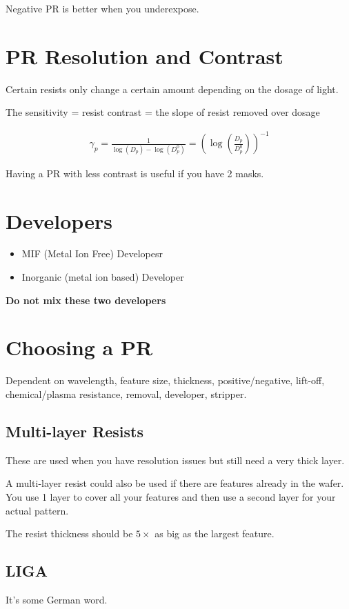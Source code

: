 \documentclass[fleqn]{report}
\newcommand{\equations} [1] {
\begin{gather*}
#1
\end{gather*}
}
\begin{document}
Negative PR is better when you underexpose.

\section{PR Resolution and Contrast}
Certain resists only change a certain amount depending 
on the dosage of light. 

The sensitivity = resist contrast = the slope of resist removed over dosage 

\equations{
    \gamma_p 
    =
    \frac{1}{
        \log(D_p)
        -
        \log(D_p^0)
    }
    =
    \left(\log(\frac{D_p}{D_p^0})\right)^{-1}
}

Having a PR with less contrast is useful if you have 2 masks. 


\section{Developers}
\begin{itemize}
    \item 
    MIF (Metal Ion Free) Developesr
    \item 
    Inorganic (metal ion based) Developer
\end{itemize}

\textbf{Do not mix these two developers}

\section{Choosing a PR}
Dependent on wavelength, feature size, thickness, positive/negative, 
lift-off, chemical/plasma resistance, removal, developer, stripper.

\subsection{Multi-layer Resists}
These are used when you have resolution issues but still need a very 
thick layer. 

A multi-layer resist could also be used if there are features already in the 
wafer. You use 1 layer to cover all your features and then use a 
second layer for your actual pattern.

The resist thickness should be $5 \times$ as big as the largest feature.

\subsection{LIGA}
It's some German word.
\end{document}
